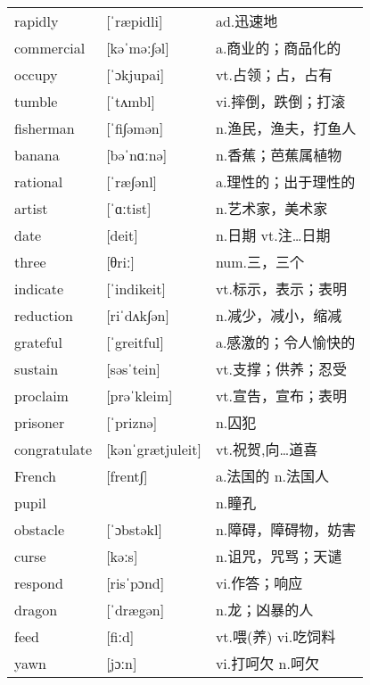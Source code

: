 \documentclass[a4paper]{article}
\begin{document}
\section{}
\begin{tabular}{l l l}

rapidly & [ˈræpidli] & ad.迅速地 \\
commercial & [kəˈməː∫əl] & a.商业的；商品化的 \\
occupy & [ˈɔkjupai] & vt.占领；占，占有 \\
tumble & [ˈtʌmbl] & vi.摔倒，跌倒；打滚 \\
fisherman & [ˈfi∫əmən] & n.渔民，渔夫，打鱼人 \\
banana & [bəˈnɑːnə] & n.香蕉；芭蕉属植物 \\
rational & [ˈræ∫ənl] & a.理性的；出于理性的 \\
artist & [ˈɑːtist] & n.艺术家，美术家 \\
date & [deit] & n.日期 vt.注…日期 \\
three & [θriː] & num.三，三个 \\
indicate & [ˈindikeit] & vt.标示，表示；表明 \\
reduction & [riˈdʌk∫ən] & n.减少，减小，缩减 \\
grateful & [ˈgreitful] & a.感激的；令人愉快的 \\
sustain & [səsˈtein] & vt.支撑；供养；忍受 \\
proclaim & [prəˈkleim] & vt.宣告，宣布；表明 \\
prisoner & [ˈpriznə] & n.囚犯 \\
congratulate & [kənˈgrætjuleit] & vt.祝贺,向…道喜 \\
French & [frent∫] & a.法国的 n.法国人 \\
pupil &  & n.瞳孔 \\
obstacle & [ˈɔbstəkl] & n.障碍，障碍物，妨害 \\
curse & [kəːs] & n.诅咒，咒骂；天谴 \\
respond & [risˈpɔnd] & vi.作答；响应 \\
dragon & [ˈdrægən] & n.龙；凶暴的人 \\
feed & [fiːd] & vt.喂(养) vi.吃饲料 \\
yawn & [jɔːn] & vi.打呵欠 n.呵欠 \\

\end{tabular}
\end{document}
